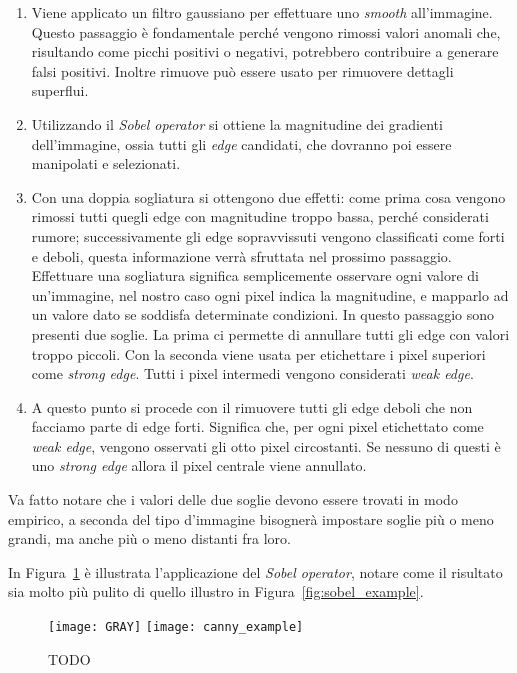 \begin{enumerate}
  \item Viene applicato un filtro gaussiano per effettuare uno \textit{smooth} all'immagine.
    Questo passaggio è fondamentale perché vengono rimossi valori anomali che, risultando come picchi positivi o negativi, potrebbero contribuire a generare falsi positivi.
    Inoltre rimuove può essere usato per rimuovere dettagli superflui.

  \item Utilizzando il \textit{Sobel operator} si ottiene la magnitudine dei gradienti dell'immagine, ossia tutti gli \textit{edge} candidati, che dovranno poi essere manipolati e selezionati.


  \item Con una doppia sogliatura si ottengono due effetti:
    come prima cosa vengono rimossi tutti quegli edge con magnitudine troppo bassa, perché considerati rumore;
    successivamente gli edge sopravvissuti vengono classificati come forti e deboli, questa informazione verrà sfruttata nel prossimo passaggio.
    Effettuare una sogliatura significa semplicemente osservare ogni valore di un'immagine, nel nostro caso ogni pixel indica la magnitudine, e mapparlo ad un valore dato se soddisfa determinate condizioni.
    In questo passaggio sono presenti due soglie.
    La prima ci permette di annullare tutti gli edge con valori troppo piccoli.
    Con la seconda viene usata per etichettare i pixel superiori come \textit{strong edge}.
    Tutti i pixel intermedi vengono considerati \textit{weak edge}.

  \item A questo punto si procede con il rimuovere tutti gli edge deboli che non facciamo parte di edge forti.
    Significa che, per ogni pixel etichettato come \textit{weak edge}, vengono osservati gli otto pixel circostanti.
    Se nessuno di questi è uno \textit{strong edge} allora il pixel centrale viene annullato.

\end{enumerate}
Va fatto notare che i valori delle due soglie devono essere trovati in modo empirico, a seconda del tipo d'immagine bisognerà impostare soglie più o meno grandi, ma anche più o meno distanti fra loro.

In Figura~\ref{fig:canny_example} è illustrata l'applicazione del \textit{Sobel operator}, notare come il risultato sia molto più pulito di quello illustro in Figura~\ref{fig:sobel_example}.
\begin{figure}[ht] %
  \begin{center}
    \texttt{[image: GRAY]}
    \texttt{[image: canny\_example]}
    \label{fig:canny_example}
    \caption{TODO }
  \end{center}
\end{figure}


